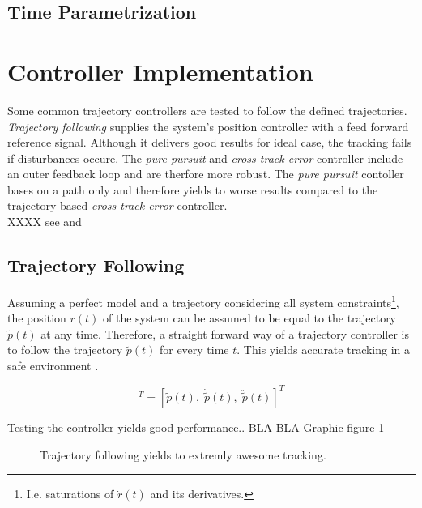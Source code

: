 \subsection{Time Parametrization}

\section{Controller Implementation}
Some common trajectory controllers are tested to follow the defined trajectories. \textit{Trajectory following} supplies the system's position controller \cite{meier} with a feed forward reference signal. Although it delivers good results for ideal case, the tracking fails if disturbances occure. The \textit{pure pursuit} and \textit{cross track error} controller include an outer feedback loop and are therfore more robust. The \textit{pure pursuit} contoller bases on a path only and therefore yields to worse results compared to the trajectory based \textit{cross track error} controller.
\\ XXXX see \cite{snider} and \cite{deluca}
\label{sec:controllerImplementation}
\subsection{Trajectory Following}
Assuming a perfect model and a trajectory considering all system constraints\footnote{I.e. saturations of $\dot{r}(t)$ and its derivatives.}, the position $r\left(t\right)$ of the system can be assumed to be equal to the trajectory $\tilde{p}(t)$ at any time. Therefore, a straight forward way of a trajectory controller is to follow the trajectory $\tilde{p}(t)$ for every time $t$. This yields accurate tracking in a safe environment \cite{doesegger}.

\begin{equation}
  [r_{ref}(t), \; \dot{r}_{ref}(t), \; \ddot{r}_{ref}(t)]^T = [\tilde{p}(t), \; \dot{\tilde{p}}(t), \; \ddot{\tilde{p}}(t)]^T
\end{equation}

Testing the controller yields good performance.. BLA BLA Graphic figure \ref{fig:trajectoryfollowing}
\begin{figure}[h]
  \begin{minipage}[t]{0.48\textwidth}
  \end{minipage}
  \hfill
  \begin{minipage}[t]{0.48\textwidth}
  \end{minipage}
  \caption{Trajectory following yields to extremly awesome tracking.}
  \label{fig:trajectoryfollowing}
\end{figure}



